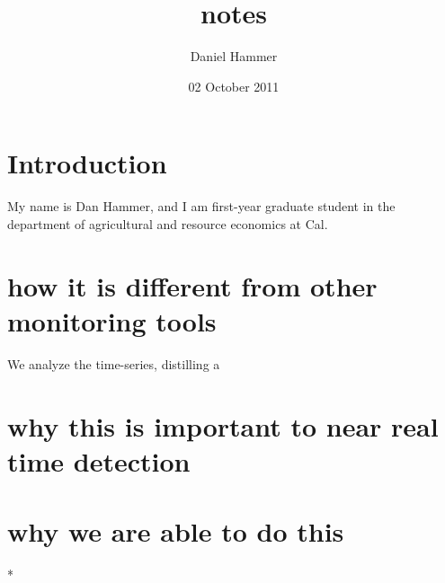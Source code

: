 \documentclass[11pt]{article}
\title{notes}
\author{Daniel Hammer}
\date{02 October 2011}
\begin{document}
\maketitle

\setcounter{tocdepth}{3}
\tableofcontents
\vspace*{1cm}
\section{Introduction}
\label{sec-1}


My name is Dan Hammer, and I am first-year graduate student in the department of agricultural and resource economics at Cal.  

\section{how it is different from other monitoring tools}
\label{sec-2}


We analyze the time-series, distilling a 

\section{why this is important to near real time detection}
\label{sec-3}


\section{why we are able to do this}
\label{sec-4}


*
\end{document}
